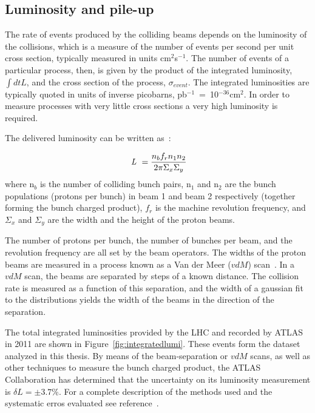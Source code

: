 \subsection{Luminosity and pile-up}\label{sec:lumiintro}

The rate of events produced by the colliding beams depends on the luminosity of the collisions, which is a measure of the number of events per second per unit cross section, typically measured in units cm$^2$s$^{-1}$. The number of events of a particular process, then, is given by the product of the integrated luminosity, $\int dt L$, and the cross section of the process, $\sigma_{event}$.  The integrated luminosities are typically quoted in units of inverse picobarns, pb$^{-1}$~=~10$^{-36}$cm$^{2}$. In order to measure processes with very little cross sections a very high luminosity is required. 

The delivered luminosity can be written as~\cite{ATLAS-CONF-2011-116}:

\begin{equation} 
\mbox{ {\it L }} = \frac{n_b f_r n_1 n_2 }{2\pi \Sigma_x \Sigma_y}
\label{eqn:lumi}
\end{equation} 
where n$_b$ is the number of colliding bunch pairs,  n$_1$ and n$_2$ are the bunch populations (protons per bunch) in beam 1 and beam 2 respectively (together forming the bunch charged product), $f_r$ is the machine revolution frequency, and $\Sigma_x$ and $\Sigma_y$ are the width and the height of the proton beams. %

The number of protons per bunch, the number of bunches per beam, and the revolution frequency are all set by the beam operators. The widths of the proton beams are measured in a process known as a Van der Meer ($vdM$) scan~\cite{vanderMeer:296752}. In a $vdM$ scan, the beams are separated by steps of a known distance. The collision rate is measured as a function of this separation, and the width of a gaussian fit to the distributions yields the width of the beams in the direction of the separation.  

The total integrated luminosities provided by the LHC and recorded by ATLAS in 2011 are shown in Figure~\ref{fig:integratedlumi}. These events form the dataset analyzed in this thesis. By means of the beam-separation or $vdM$ scans, as well as other techniques to measure the bunch charged product, the ATLAS Collaboration has determined that the uncertainty on its luminosity measurement is $\delta L = \pm 3.7$\%. For a complete description of the methods used and the systematic erros evaluated see reference~\cite{ATLAS-CONF-2011-116}.

